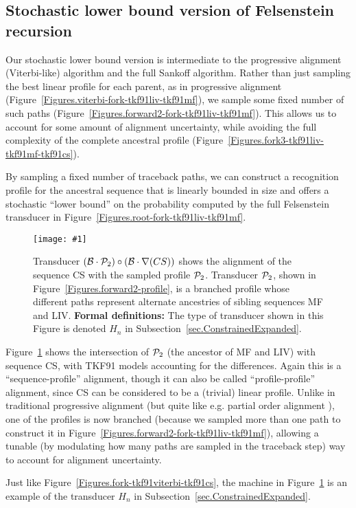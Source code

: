 \documentclass{article}
\newcommand{\secref}[1]{Subsection~\ref{sec.#1}}
\newcommand{\figref}[1]{Figure~\ref{Figures.#1}}
\newcommand{\figlabel}[1]{\label{Figures.#1}}
\newcommand{\easyfig}[4]{
\begin{figure}
\texttt{[image: \#1]}
\caption{ \figlabel{#3} #4}
\end{figure}}
\newcommand{\widepngfig}[2]{\easyfig{#1.png}{width=\textwidth}{#1}{#2}}
\newcommand\tkf{{\cal B}}
\newcommand\profile{{\cal P}}
\newcommand\formaldefs{{\bf Formal definitions: }}
\newcommand\fork{\circ}
\newcommand\recognize{\nabla}
\begin{document}
\subsection{Stochastic lower bound version of Felsenstein recursion}

Our stochastic lower bound version is intermediate to the progressive alignment (Viterbi-like) algorithm and the full Sankoff algorithm.
Rather than just sampling the best linear profile for each parent, as in progressive alignment
(\figref{viterbi-fork-tkf91liv-tkf91mf}),
we sample some fixed number of such paths
(\figref{forward2-fork-tkf91liv-tkf91mf}).
This allows us to account for some amount of alignment uncertainty,
while avoiding the full complexity of the complete ancestral profile
(\figref{fork3-tkf91liv-tkf91mf-tkf91cs}).

By sampling a fixed number of traceback paths,
we can construct a recognition profile for the ancestral sequence
that is linearly bounded in size and offers a stochastic ``lower bound''
on the probability computed by the full Felsenstein transducer in \figref{root-fork-tkf91liv-tkf91mf}.

\widepngfig{fork-tkf91forward2-tkf91cs}{Transducer $(\tkf \cdot \profile_2)\fork(\tkf \cdot \recognize(CS))$ shows the alignment of the sequence CS with the sampled profile $\profile_2$.
Transducer $\profile_2$, shown in \figref{forward2-profile}, is a branched profile whose different paths represent alternate ancestries of sibling sequences MF and LIV.
\formaldefs
The type of transducer shown in this Figure is denoted $H_n$ in \secref{ConstrainedExpanded}.
}

\figref{fork-tkf91forward2-tkf91cs} shows the intersection of $\profile_2$ (the ancestor of MF and LIV) with sequence CS, with TKF91 models accounting for the differences.
 Again this is a ``sequence-profile'' alignment, though it can also be called ``profile-profile'' alignment,
since CS can be considered to be a (trivial) linear profile.  
Unlike in traditional progressive alignment
 (but quite like e.g. partial order alignment \cite{LeeGrassoSharlow2002}),
one of the profiles is now branched
 (because we sampled more than one path to construct it in \figref{forward2-fork-tkf91liv-tkf91mf}), allowing a tunable (by modulating how many paths are sampled in the traceback step)
way to account for alignment uncertainty.  

Just like \figref{fork-tkf91viterbi-tkf91cs},
the machine in \figref{fork-tkf91forward2-tkf91cs}
is an example of the transducer $H_n$
in \secref{ConstrainedExpanded}.
\end{document}
